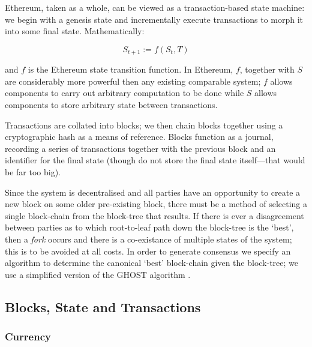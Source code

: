 \documentclass[9pt,oneside]{amsart}
\begin{document}
\begin{multicols}{2}
Ethereum, taken as a whole, can be viewed as a transaction-based state machine: we begin with a genesis state and incrementally execute transactions to morph it into some final state. Mathematically:

\begin{equation}
S_{t+1} := f(S_t, T)
\end{equation}

and $f$ is the Ethereum state transition function. In Ethereum, $f$, together with $S$ are considerably more powerful then any existing comparable system; $f$ allows components to carry out arbitrary computation to be done while $S$ allows components to store arbitrary state between transactions.



Transactions are collated into blocks; we then chain blocks together using a cryptographic hash as a means of reference. Blocks function as a journal, recording a series of transactions together with the previous block and an identifier for the final state (though do not store the final state itself---that would be far too big).

Since the system is decentralised and all parties have an opportunity to create a new block on some older pre-existing block, there must be a method of selecting a single block-chain from the block-tree that results. If there is ever a disagreement between parties as to which root-to-leaf path down the block-tree is the `best', then a \textit{fork} occurs and there is a co-existance of multiple states of the system; this is to be avoided at all costs. In order to generate consensus we specify an algorithm to determine the canonical `best' block-chain given the block-tree; we use a simplified version of the GHOST algorithm \cite{ghost}.

\subsection{Blocks, State and Transactions} \label{ch:bst}

\subsubsection{Currency}


\end{multicols}
\end{document}
